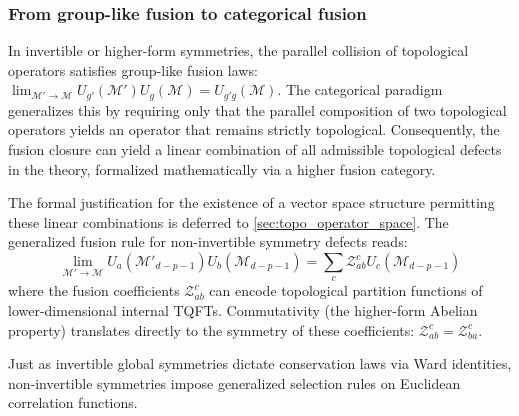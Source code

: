 \documentclass[aps,preprint,nofootinbib,preprintnumbers,eqsecnum,superscriptaddress]{revtex4}
\numberwithin{equation}{section}
\begin{document}
\subsubsection{From group-like fusion to categorical fusion}

In invertible or higher-form symmetries, the parallel collision of topological operators satisfies group-like fusion laws: $\lim_{\mathcal{M'} \to \mathcal{M}} U_{g'}(\mathcal{M}') U_g(\mathcal{M}) = U_{g'g}(\mathcal{M})$. The categorical paradigm generalizes this by requiring only that the parallel composition of two topological operators yields an operator that remains strictly topological. Consequently, the fusion closure can yield a linear combination of all admissible topological defects in the theory, formalized mathematically via a higher fusion category.

The formal justification for the existence of a vector space structure permitting these linear combinations is deferred to \ref{sec:topo_operator_space}. The generalized fusion rule for non-invertible symmetry defects reads:
\begin{equation}
\lim_{\mathcal{M'} \to\mathcal{M} } U_{a}(\mathcal{M'}_{d-p-1})U_{b}(\mathcal{M}_{d-p-1}) = \sum_c \mathcal{Z}^c_{ab} U_{c}(\mathcal{M}_{d-p-1})
\end{equation}
where the fusion coefficients $\mathcal{Z}^c_{ab}$ can encode topological partition functions of lower-dimensional internal TQFTs. Commutativity (the higher-form Abelian property) translates directly to the symmetry of these coefficients: $\mathcal{Z}^c_{ab} = \mathcal{Z}^c_{ba}$.

Just as invertible global symmetries dictate conservation laws via Ward identities, non-invertible symmetries impose generalized selection rules on Euclidean correlation functions.
\end{document}
